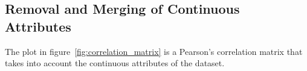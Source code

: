 \subsection{Removal and Merging of Continuous Attributes}\label{sec:var_elim_creation}



 The plot in figure~\ref{fig:correlation_matrix} is a Pearson's correlation matrix that takes into
account the continuous attributes of the dataset.\\


